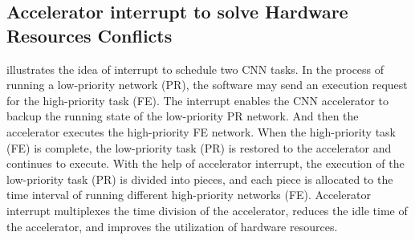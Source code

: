 

\subsection{ Accelerator interrupt to solve Hardware Resources Conflicts }



 illustrates the idea of interrupt to schedule two CNN tasks. In the process of running a low-priority network (PR), the software may send an execution request for the high-priority task (FE). The interrupt enables the CNN accelerator to backup the running state of the low-priority PR network. And then the accelerator executes the high-priority FE network. When the high-priority task (FE) is complete, the low-priority task (PR) is restored to the accelerator and continues to execute.
With the help of accelerator interrupt, the execution of the low-priority task (PR) is divided into pieces, and each piece is allocated to the time interval of running different high-priority networks (FE). 
Accelerator interrupt multiplexes the time division of the accelerator, reduces the idle time of the accelerator, and improves the utilization of hardware resources. 



